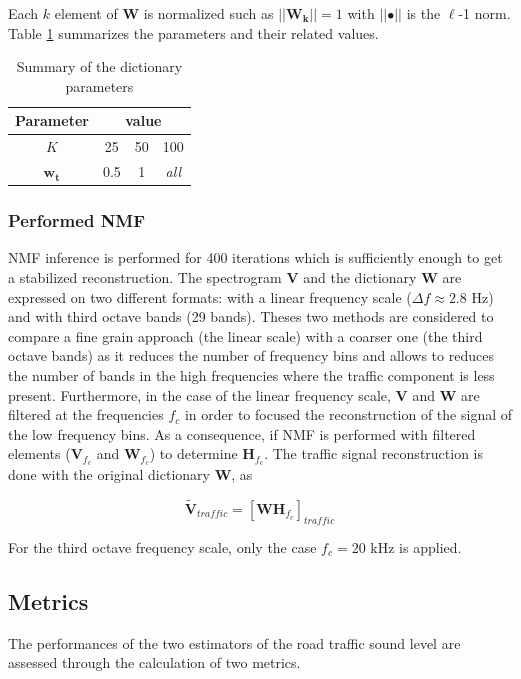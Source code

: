 \documentclass[twocolumn,a4paper,10pt]{article}
\begin{document}
Each $k$ element of $\mathbf{W}$ is normalized such as $\vert \vert \mathbf{W_k} \vert \vert = 1$ with $\vert \vert \bullet \vert\vert$ is the $\ell$-1 norm. Table \ref{tab:dictionary_factors} summarizes the parameters and their related values.

\begin{table}[h]
\centering
\begin{tabular}{cccc}
Parameter &  \multicolumn{3}{c}{value}\\ \hline
$K$ & 25  & 50 & 100 \\ \hline
$\mathbf{w_t}$& 0.5 & 1  & \textit{all}
\end{tabular}
\caption{Summary of the dictionary parameters}
\label{tab:dictionary_factors}
\end{table} 

\subsubsection{Performed NMF}

NMF inference is performed for 400 iterations which is sufficiently enough to get a stabilized reconstruction. The spectrogram $\mathbf{V}$ and the dictionary $\mathbf{W}$ are expressed on two different formats: with a linear frequency scale ($\Delta f \approx 2.8$ Hz) and with third octave bands (29 bands). Theses two methods are considered to compare a fine grain approach (the linear scale) with a coarser one (the third octave bands) as it reduces the number of frequency bins and allows to reduces the number of bands in the high frequencies where the traffic component is less present.  Furthermore, in the case of the linear frequency scale, $\mathbf{V}$ and $\mathbf{W}$ are filtered at the frequencies $f_c$ in order to focused the reconstruction of the signal of the low frequency bins. As a consequence, if NMF is performed with filtered elements ($\mathbf{V}_{f_c}$ and $\mathbf{W}_{f_c}$) to determine $\mathbf{H}_{f_c}$. The traffic signal reconstruction is done with the original dictionary $\mathbf{W}$, as

\begin{equation}
\mathbf{\tilde{V}}_{traffic} = \left[\mathbf{WH}_{f_c}\right]_{traffic}
\end{equation}

For the third octave frequency scale, only the case $f_c = 20$ kHz is applied.

\subsection{Metrics}
The performances of the two estimators of the road traffic sound level are assessed through the calculation of two metrics.
\end{document}
